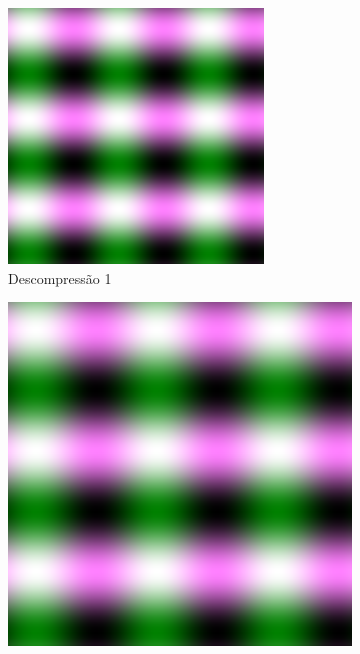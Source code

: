 \documentclass{article}
\begin{document}
\begin{figure}[ht]
  \centering
  \begin{subfigure}{0.3\textwidth}
    \centering
    \includegraphics[width=\textwidth]{senoidal/decompress3vezes/decompressed1.png}
    \caption{Descompressão 1}
  \end{subfigure}%
  \hfill
  \begin{subfigure}{0.3\textwidth}
    \centering
    \includegraphics[width=\textwidth]{senoidal/decompress3vezes/decompressed2.png}

\end{subfigure}
\end{figure}
\end{document}
